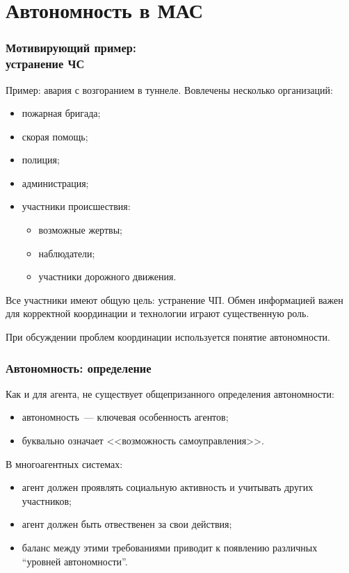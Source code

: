 \documentclass{beamer}
\begin{document}
\section{Автономность в МАС}

\begin{frame}
  \frametitle{Мотивирующий пример: \\ устранение ЧС}
  Пример: авария с возгоранием в туннеле. Вовлечены несколько организаций:
  \begin{itemize}
    \item пожарная бригада;
    \item скорая помощь;
    \item полиция;
    \item администрация;
    \item участники происшествия:
      \begin{itemize}
        \item возможные жертвы;
        \item наблюдатели;
        \item участники дорожного движения.
      \end{itemize}
  \end{itemize}

  Все участники имеют общую цель: устранение ЧП. Обмен информацией важен для корректной
  координации и технологии играют существенную роль.

  При обсуждении проблем координации используется понятие автономности.
\end{frame}

\begin{frame}
  \frametitle{Автономность: определение}
  Как и для агента, не существует общепризанного определения автономности:
  \begin{itemize}
    \item автономность~--- ключевая особенность агентов;
    \item буквально означает <<возможность самоуправления>>.
  \end{itemize}

  В многоагентных системах:
  \begin{itemize}
    \item агент должен проявлять социальную активность и учитывать других участников;
    \item агент должен быть отвественен за свои действия;
    \item баланс между этими требованиями приводит к появлению различных ``уровней автономности''.
  \end{itemize}
\end{frame}
\end{document}
